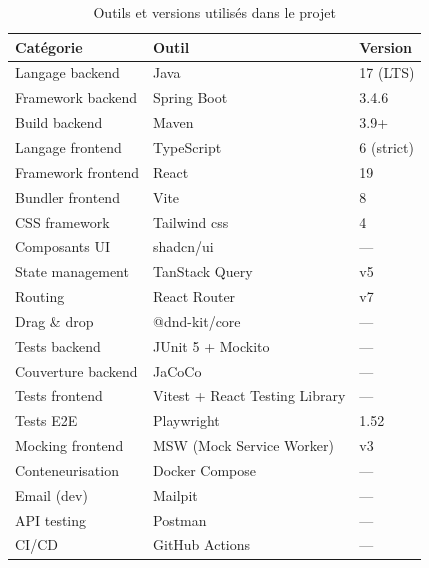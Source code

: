 \begin{table}[H]
\begin{xltabular}{\textwidth}{lXX}
        \textbf{Catégorie} & \textbf{Outil}                 & \textbf{Version} \\
        \midrule
        Langage backend    & Java                           & 17 (LTS)         \\
        Framework backend  & Spring Boot                    & 3.4.6            \\
        Build backend      & Maven                          & 3.9+             \\
        Langage frontend   & TypeScript                     & 6 (strict)       \\
        Framework frontend & React                          & 19               \\
        Bundler frontend   & Vite                           & 8                \\
        CSS framework      & Tailwind \acrshort{css}                   & 4                \\
        Composants UI      & shadcn/ui                      & —                \\
        State management   & TanStack Query                 & v5               \\
        Routing            & React Router                   & v7               \\
        Drag \& drop       & @dnd-kit/core                  & —                \\
        Tests backend      & JUnit 5 + Mockito              & —                \\
        Couverture backend & JaCoCo                         & —                \\
        Tests frontend     & Vitest + React Testing Library & —                \\
        Tests E2E          & Playwright                     & 1.52             \\
        Mocking frontend   & MSW (Mock Service Worker)      & v3               \\
        Conteneurisation   & Docker Compose                 & —                \\
        Email (dev)        & Mailpit                        & —                \\
        API testing        & Postman                        & —                \\
        CI/CD              & GitHub Actions                 & —                \\
        \bottomrule
    \end{xltabular}
    \caption{Outils et versions utilisés dans le projet}
    \label{tab:outils_dev}
\end{table}

